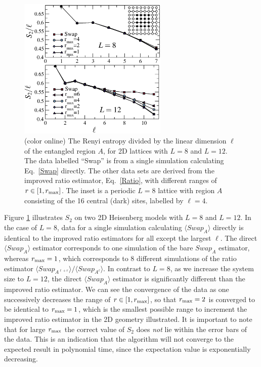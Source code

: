 \documentclass[prl,aps,twocolumn,floatfix,amsmath,amssymb,superscriptaddress,tightenlines]{revtex4}
\begin{document}
\begin{figure} {
\includegraphics[width=2.8in]{L8n12_ratio.eps} \caption{(color online) 
\label{L16fig}
The Renyi entropy divided by the linear dimension $\ell$ of the entangled region $A$, for 2D lattices with $L=8$ and $L=12$.  The data labelled ``Swap'' is from a single simulation calculating Eq.~\eqref{Swap} directly.  The other
data sets are derived from the improved ratio estimator, Eq.~\eqref{Ratio}, with different ranges of $r \in [1,r_{\rm max}]$.  The inset 
is a periodic $L=8$ lattice with region $A$ consisting of the 16 central (dark) sites, labelled by $\ell = 4$.
}
} \end{figure}

Figure \ref{L16fig} illustrates $S_2$ on two 2D Heisenberg models with  $L=8$ and  $L=12$.  In the case of $L=8$, data for a single 
simulation calculating $\langle Swap_A \rangle$ directly is identical to the improved ratio estimators for all except the largest $\ell$.  
The direct $\langle Swap_A \rangle$ estimator corresponds to one simulation of the bare $Swap_A$ estimator, whereas $r_{\rm max}=1$, which corresponds to 8 different simulations of the ratio estimator ${\langle Swap_{A^{\ell+r}}\rangle}/{\langle Swap_{A^{\ell}}\rangle}$. 
In contrast to $L=8$, as we increase the system size to $L=12$, the direct  $\langle Swap_A \rangle$ estimator is significantly different than 
the improved ratio estimator.  We can see the convergence of the data as one successively decreases the range of $r \in [1,r_{\rm max}]$, 
so that $r_{\rm max}=2$ is converged to be identical to $r_{\rm max}=1$, which is the smallest possible range to increment the 
improved ratio estimator in the 2D geometry illustrated.  It is important to note that for large $r_{\rm max}$ the correct value of $S_2$ does {\it not} lie within the error bars of the data.  This is an indication that the algorithm will not converge to the expected result in polynomial time, since the expectation value is exponentially decreasing.
\end{document}
